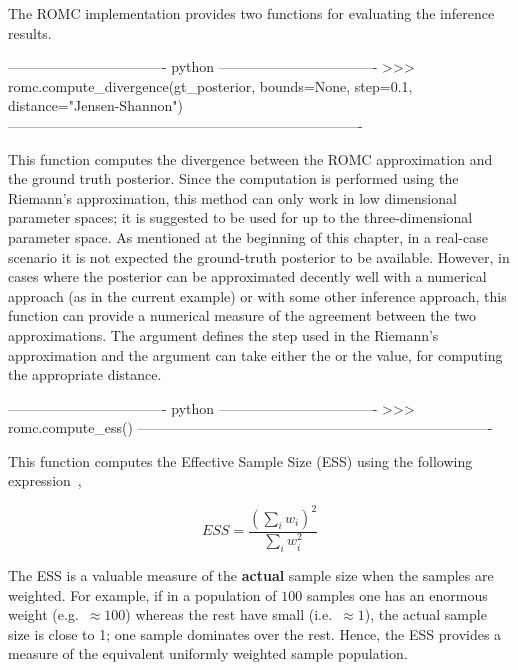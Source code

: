 The ROMC implementation provides two functions for evaluating the inference results.

\begin{Code}
---------------------------------- python ----------------------------------  
>>> romc.compute_divergence(gt_posterior,
                            bounds=None,
                            step=0.1,
                            distance="Jensen-Shannon")
----------------------------------------------------------------------------
\end{Code}

\noindent
This function computes the divergence between the ROMC approximation
and the ground truth posterior. Since the computation is performed
using the Riemann's approximation, this method can only work in low
dimensional parameter spaces; it is suggested to be used for up to the
three-dimensional parameter space. As mentioned at the beginning of
this chapter, in a real-case scenario it is not expected the
ground-truth posterior to be available. However, in cases where the
posterior can be approximated decently well with a numerical approach
(as in the current example) or with some other inference approach,
this function can provide a numerical measure of the agreement between
the two approximations. The argument  defines the step used
in the Riemann's approximation and the argument  can
take either the  or the 
value, for computing the appropriate distance.

\begin{Code}
---------------------------------- python ----------------------------------  
>>> romc.compute_ess()
----------------------------------------------------------------------------
\end{Code}

\noindent
This function computes the Effective Sample Size (ESS) using the
following expression~\cite{Sudman1967},

\begin{equation} \label{eq:ESS}
  ESS = \frac{(\sum_i w_i)^2}{\sum_i w_i^2}
\end{equation}

The ESS is a valuable measure of the \textbf{actual} sample size when
the samples are weighted. For example, if in a population of $100$
samples one has an enormous weight (e.g.\ $\approx 100$) whereas the
rest have small (i.e.\ $\approx 1$), the actual sample size is close
to 1; one sample dominates over the rest. Hence, the ESS provides a
measure of the equivalent uniformly weighted sample population.



